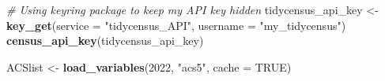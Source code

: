 \documentclass[
  12pt,
]{article}
\newenvironment{Shaded}{\begin{snugshade}}{\end{snugshade}}
\newcommand{\AttributeTok}[1]{\textcolor[rgb]{0.13,0.29,0.53}{#1}}
\newcommand{\CommentTok}[1]{\textcolor[rgb]{0.56,0.35,0.01}{\textit{#1}}}
\newcommand{\ConstantTok}[1]{\textcolor[rgb]{0.56,0.35,0.01}{#1}}
\newcommand{\DecValTok}[1]{\textcolor[rgb]{0.00,0.00,0.81}{#1}}
\newcommand{\FunctionTok}[1]{\textcolor[rgb]{0.13,0.29,0.53}{\textbf{#1}}}
\newcommand{\NormalTok}[1]{#1}
\newcommand{\OtherTok}[1]{\textcolor[rgb]{0.56,0.35,0.01}{#1}}
\newcommand{\SpecialCharTok}[1]{\textcolor[rgb]{0.81,0.36,0.00}{\textbf{#1}}}
\newcommand{\StringTok}[1]{\textcolor[rgb]{0.31,0.60,0.02}{#1}}
\begin{document}
\begin{Shaded}
\end{Shaded}

\begin{Shaded}
\begin{Highlighting}[]
\CommentTok{\# Using keyring package to keep my API key hidden}
\NormalTok{tidycensus\_api\_key }\OtherTok{\textless{}{-}} \FunctionTok{key\_get}\NormalTok{(}\AttributeTok{service =} \StringTok{"tidycensus\_API"}\NormalTok{, }
                              \AttributeTok{username =} \StringTok{"my\_tidycensus"}\NormalTok{)}
\FunctionTok{census\_api\_key}\NormalTok{(tidycensus\_api\_key)}

\NormalTok{ACSlist }\OtherTok{\textless{}{-}} \FunctionTok{load\_variables}\NormalTok{(}\DecValTok{2022}\NormalTok{, }\StringTok{"acs5"}\NormalTok{, }\AttributeTok{cache =} \ConstantTok{TRUE}\NormalTok{)}


\end{Highlighting}
\end{Shaded}
\end{document}
